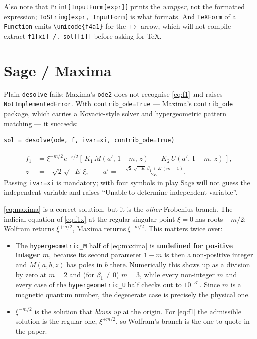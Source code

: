 \documentclass[11pt]{article}
\begin{document}
Also note that \verb|Print[InputForm[expr]]| prints the \emph{wrapper}, not
the formatted expression; \verb|ToString[expr, InputForm]| is what formats.
And \verb|TeXForm| of a \verb|Function| emits \verb|\unicode{f4a1}| for the
$\mapsto$ arrow, which will not compile --- extract \verb|f1[xi] /. sol[[i]]|
before asking for \TeX.

\section{Sage / Maxima}\label{sec:sage}

Plain \verb|desolve| fails: Maxima's \verb|ode2| does not recognise
\eqref{eq:f1} and raises \verb|NotImplementedError|.  With
\verb|contrib_ode=True| --- Maxima's \verb|contrib_ode| package, which
carries a Kovacic-style solver and hypergeometric pattern matching ---
it succeeds:
\begin{lstlisting}
sol = desolve(ode, f, ivar=xi, contrib_ode=True)
\end{lstlisting}
\begin{equation}\label{eq:maxima}
\begin{aligned}
f_1 &= \xi^{-m/2}\, e^{-z/2}
       \left[\, K_1\, M(a',\,1-m,\,z) \;+\; K_2\, U(a',\,1-m,\,z) \,\right], \\[4pt]
z &= -\sqrt{2}\,\sqrt{-E}\,\xi ,
\qquad
a' = -\,\frac{\sqrt{2}\,\sqrt{-E}\,\beta_1 + E\,(m-1)}{2E} .
\end{aligned}
\end{equation}
Passing \verb|ivar=xi| is mandatory; with four symbols in play Sage will
not guess the independent variable and raises ``Unable to determine
independent variable''.

\eqref{eq:maxima} is a correct solution, but it is the \emph{other}
Frobenius branch.  The indicial equation of \eqref{eq:f1x} at the regular
singular point $\xi=0$ has roots $\pm m/2$; Wolfram returns $\xi^{+m/2}$,
Maxima returns $\xi^{-m/2}$.  This matters twice over:

\begin{itemize}
\item The \verb|hypergeometric_M| half of \eqref{eq:maxima} is
  \textbf{undefined for positive integer $m$}, because its second parameter
  $1-m$ is then a non-positive integer and $M(a,b,z)$ has poles in $b$
  there.  Numerically this shows up as a division by zero at
  $m=2$ and (for $\beta_1\neq0$) $m=3$, while every non-integer $m$ and
  every case of the \verb|hypergeometric_U| half checks out to $10^{-31}$.
  Since $m$ is a magnetic quantum number, the degenerate case is precisely
  the physical one.
\item $\xi^{-m/2}$ is the solution that \emph{blows up} at the origin.  For
  \eqref{eq:f1} the admissible solution is the regular one, $\xi^{+m/2}$,
  so Wolfram's branch is the one to quote in the paper.
\end{itemize}
\end{document}
